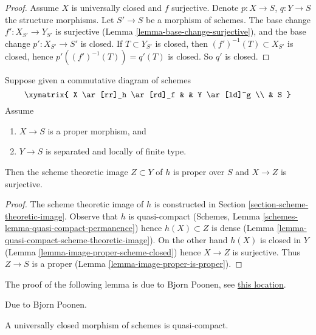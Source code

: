 \begin{proof}
Assume $X$ is universally closed and $f$ surjective.
Denote $p : X \to S$, $q : Y \to S$ the structure morphisms.
Let $S' \to S$ be a morphism of schemes. The base change
$f' : X_{S'} \to Y_{S'}$ is surjective
(Lemma \ref{lemma-base-change-surjective}), and the base
change $p' : X_{S'} \to S'$ is closed.
If $T \subset Y_{S'}$ is closed, then $(f')^{-1}(T) \subset X_{S'}$
is closed, hence $p'((f')^{-1}(T)) = q'(T)$ is closed.
So $q'$ is closed.
\end{proof}

\begin{lemma}
\label{lemma-scheme-theoretic-image-is-proper}
Suppose given a commutative diagram of schemes
$$
\xymatrix{
X \ar[rr]_h \ar[rd]_f & & Y \ar[ld]^g \\
& S
}
$$
Assume
\begin{enumerate}
\item $X \to S$ is a proper morphism, and
\item $Y \to S$ is separated and locally of finite type.
\end{enumerate}
Then the scheme theoretic image $Z \subset Y$ of $h$
is proper over $S$ and $X \to Z$ is surjective.
\end{lemma}

\begin{proof}
The scheme theoretic image of $h$ is constructed in Section
\ref{section-scheme-theoretic-image}.
Observe that $h$ is quasi-compact
(Schemes, Lemma \ref{schemes-lemma-quasi-compact-permanence})
hence $h(X) \subset Z$
is dense (Lemma \ref{lemma-quasi-compact-scheme-theoretic-image}).
On the other hand $h(X)$ is closed in $Y$
(Lemma \ref{lemma-image-proper-scheme-closed})
hence $X \to Z$ is surjective.
Thus $Z \to S$ is a proper (Lemma \ref{lemma-image-proper-is-proper}).
\end{proof}

\noindent
The proof of the following lemma is due to Bjorn Poonen, see
\href{http://mathoverflow.net/questions/23337/is-a-universally-closed-morphism-of-schemes-quasi-compact/23528#23528}{this location}.

\begin{lemma}
\label{lemma-universally-closed-quasi-compact}
\begin{reference}
Due to Bjorn Poonen.
\end{reference}
A universally closed morphism of schemes is quasi-compact.
\end{lemma}

